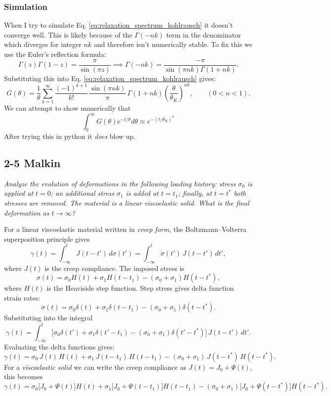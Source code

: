 \subsubsection{Simulation}
When I try to simulate Eq. \ref{eq:relaxation_spectrum_kohlrausch} it doesn't converge well.
This is likely because of the $\Gamma(-nk)$ term in the denominator which diverges for integer $nk$ and therefore isn't numerically stable.
To fix this we use the Euler's reflection formula:
\[
	\Gamma(z) \Gamma(1 - z) = \frac{\pi}{\sin(\pi z)}
	\implies
	\Gamma(-nk) = \frac{-\pi}{\sin(\pi nk) \Gamma(1 + nk)}.
\]
Substituting this into Eq. \ref{eq:relaxation_spectrum_kohlrausch} gives:
\[
G(\theta)
=\frac{1}{\theta}\sum_{k=1}^\infty \frac{(-1)^{k+1}}{k!}\,
\frac{\sin(\pi nk)}{\pi}\,\Gamma(1+nk)
\left(\frac{\theta}{\theta_K}\right)^{nk},
\qquad (0<n<1).
\]
We can attempt to show numerically that
\[
	\int_0^\infty G(\theta) e^{-t/\theta} d\theta
	\approx e^{-(t/\theta_K)^n}
\]
After trying this in python it \emph{does} blow up.

\subsection{2-5 Malkin}
\textit{Analyze the evolution of deformations in the following loading history: stress $\sigma_0$ is applied at $t=0$; an additional stress $\sigma_1$ is added at $t=t_1$; finally, at $t=t^*$ both stresses are removed. The material is a linear viscoelastic solid. What is the final deformation as $t\to\infty$?}

For a linear viscoelastic material written in \emph{creep form}, the Boltzmann--Volterra superposition principle gives
\[
\gamma(t)=\int_{-\infty}^{t} J(t-t')\, d\sigma(t')
=\int_{-\infty}^{t} \dot\sigma(t')\,J(t-t')\,dt',
\]
where $J(t)$ is the creep compliance.
The imposed stress is
\[
\sigma(t)=\sigma_0 H(t)+\sigma_1 H(t-t_1)-(\sigma_0+\sigma_1)H(t-t^*),
\]
where $H(t)$ is the Heaviside step function.
Step stress gives delta function strain rates:
\[
\dot\sigma(t)=\sigma_0\delta(t)+\sigma_1\delta(t-t_1)-(\sigma_0+\sigma_1)\delta(t-t^*).
\]
Substituting into the integral
\[
\gamma(t)
=\int_{-\infty}^{t} \big[\sigma_0\delta(t')+\sigma_1\delta(t'-t_1)-(\sigma_0+\sigma_1)\delta(t'-t^*)\big]\,J(t-t')\,dt'.
\]
Evaluating the delta functions gives:
\[
\gamma(t)
=\sigma_0\,J(t)\,H(t)
+\sigma_1\,J(t-t_1)\,H(t-t_1)
-(\sigma_0+\sigma_1)\,J(t-t^*)\,H(t-t^*).
\]
For a \emph{viscoelastic solid} we can write the creep compliance as $J(t)=J_0+\Psi(t)$, this becomes
\[
\gamma(t)
=\sigma_0\big[J_0+\Psi(t)\big]H(t)
+\sigma_1\big[J_0+\Psi(t-t_1)\big]H(t-t_1)
-(\sigma_0+\sigma_1)\big[J_0+\Psi(t-t^*)\big]H(t-t^*).
\]


